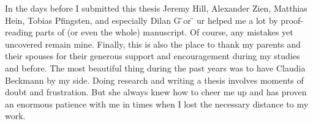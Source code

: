 \begin{acknowledgements}
In the days before I submitted this thesis Jeremy Hill, Alexander Zien, Matthias Hein, Tobias Pfingsten, and especially Dilan G ̈or ̈ ur helped me a lot by proof-reading parts of (or even the whole) manuscript. Of course, any mistakes yet uncovered remain mine. Finally, this is also the place to thank my parents and their spouses for their generous support and encouragement during my studies and before.
The most beautiful thing during the past years was to have Claudia Beckmann by my side. Doing research and writing a thesis involves moments of doubt and frustration. But she always knew how to cheer me up and has proven an enormous patience with me in times when I lost the necessary distance to my work.


\end{acknowledgements}
